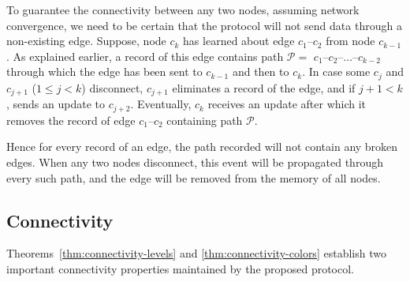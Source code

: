 \documentclass[conference]{IEEEtran}
\theoremstyle{definition}
\newcommand{\cP}{{\mathcal{P}}}
\begin{document}
To guarantee the connectivity between any two nodes, assuming network convergence, we need to be certain that the protocol will not send data through a non-existing edge. Suppose, node $c_k$ has learned about edge $c_1$--$c_2$ from node $c_{k-1}$. As explained earlier, a record of this edge contains path $\cP = $ $c_1$--$c_2$--...--$c_{k-2}$ through which the edge has been sent to $c_{k-1}$ and then to $c_k$. In case some $c_j$ and $c_{j+1}$ ($1 \le j < k$) disconnect, $c_{j+1}$ eliminates a record of the edge, and if $j+1 < k$, sends an update to $c_{j+2}$. Eventually, $c_k$ receives an update after which it removes the record of edge $c_1$--$c_2$ containing path $\cP$.

Hence for every record of an edge, the path recorded will not contain any broken edges. When any two nodes disconnect, this event will be propagated through every such path, and the edge will be removed from the memory of all nodes.


\subsection{Connectivity}
\label{sec:analysis:connectivity}

Theorems~\ref{thm:connectivity-levels} and \ref{thm:connectivity-colors} establish 
two important connectivity properties maintained by the proposed protocol.
\end{document}
